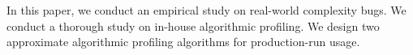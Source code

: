 In this paper, we conduct an empirical study on real-world complexity bugs.
We conduct a thorough study on in-house algorithmic profiling.
We design two approximate algorithmic profiling algorithms for production-run usage. 
